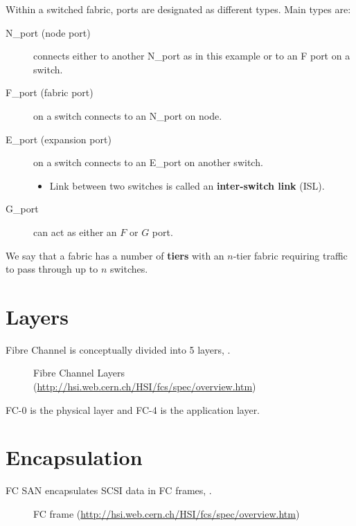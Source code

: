 Within a switched fabric, ports are designated as different types. Main
types are:

\begin{description}
\item[N\_port (node port)]
connects either to another N\_port as in this example or to an F port on
a switch.
\item[F\_port (fabric port)]
on a switch connects to an N\_port on node.
\item[E\_port (expansion port)]
on a switch connects to an E\_port on another switch.

\begin{itemize}

\item
  Link between two switches is called an \textbf{inter-switch link}
  (ISL).
\end{itemize}
\item[G\_port]
can act as either an \(F\) or \(G\) port.
\end{description}

We say that a fabric has a number of \textbf{tiers} with an \(n\)-tier
fabric requiring traffic to pass through up to \(n\) switches.

\section{Layers}\label{layers}

Fibre Channel is conceptually divided into 5 layers, .

\begin{figure}
\centering
\caption{Fibre Channel Layers
(\url{http://hsi.web.cern.ch/HSI/fcs/spec/overview.htm}){}}
\end{figure}

FC-0 is the physical layer and FC-4 is the application layer.

\section{Encapsulation}\label{encapsulation}

FC SAN encapsulates SCSI data in FC frames, .

\begin{figure}
\centering
\caption{FC frame
(\url{http://hsi.web.cern.ch/HSI/fcs/spec/overview.htm}){}}
\end{figure}


